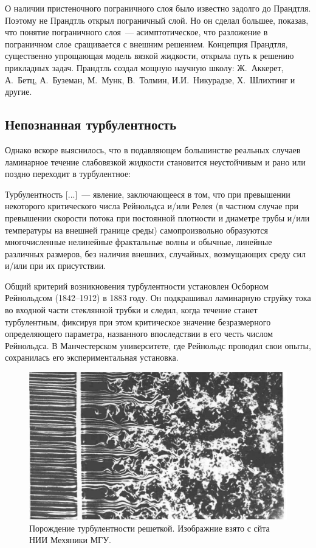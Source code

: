 О наличии пристеночного пограничного слоя было известно задолго до Прандтля. Поэтому не Прандтль открыл 
пограничный слой. Но он сделал большее, показав, что понятие пограничного слоя~--- асимптотическое, что 
разложение в пограничном слое сращивается с внешним решением. Концепция Прандтля, существенно упрощающая 
модель вязкой жидкости, открыла путь к решению прикладных задач. Прандтль создал мощную научную школу: 
Ж.~Аккерет, А.~Бетц, А.~Буземан, М.~Мунк, В.~Толмин, И.И.~Никурадзе, Х.~Шлихтинг и другие.

\subsection*{Непознанная турбулентность}

Однако вскоре выяснилось, что в подавляющем большинстве реальных случаев ламинарное течение слабовязкой жидкости 
становится неустойчивым и рано или поздно переходит в турбулентное:

Турбулентность [...]~--- явление, заключающееся в том, что при превышении некоторого критического числа 
Рейнольдса и/или Релея (в частном случае при превышении скорости потока при постоянной плотности и диаметре
трубы и/или температуры на внешней границе среды) самопроизвольно образуются многочисленные нелинейные 
фрактальные волны и обычные, линейные различных размеров, без наличия внешних, случайных, возмущающих 
среду сил и/или при их присутствии.

Общий критерий возникновения турбулентности установлен Осборном Рейнольдсом (1842--1912) в 1883 году. 
Он подкрашивал ламинарную струйку тока во входной части стеклянной трубки и следил, когда течение станет 
турбулентным, фиксируя при этом критическое значение безразмерного определяющего параметра, названного 
впоследствии в его честь числом Рейнольдса. В Манчестерском университете, где Рейнольдс проводил свои опыты, 
сохранилась его экспериментальная установка.

\begin{figure}[htp]
\centering
\includegraphics[width=0.7\linewidth]{historyImg/turb.pdf}
\caption{Порождение турбулентности решеткой. Изображние взято с сйта НИИ Мехяники МГУ.}
\label{img:turb}
\end{figure}

